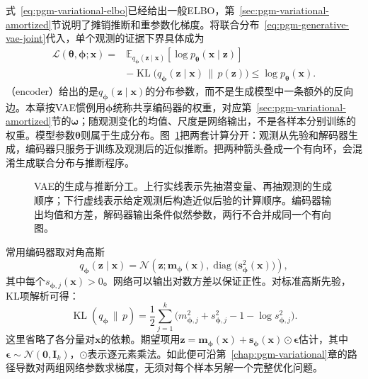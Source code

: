 式~\eqref{eq:pgm-variational-elbo}已经给出一般ELBO，第~\ref{sec:pgm-variational-amortized}节说明了摊销推断和重参数化梯度。将联合分布~\eqref{eq:pgm-generative-vae-joint}代入，单个观测的证据下界具体成为
\begin{equation}
  \label{eq:pgm-generative-vae-elbo}
  \begin{aligned}
    \mathcal{L}(\bm{\theta},\bm{\phi};\bm{x})
    ={}&\mathbb{E}_{q_{\bm{\phi}}(\bm{z}\mid\bm{x})}
       [\log p_{\bm{\theta}}(\bm{x}\mid\bm{z})]\\
      &-\operatorname{KL}\bigl(
       q_{\bm{\phi}}(\bm{z}\mid\bm{x})\,\|\,p(\bm{z})\bigr)
      \leq\log p_{\bm{\theta}}(\bm{x}).
  \end{aligned}
\end{equation}
（encoder）给出的是$q_{\bm{\phi}}(\bm{z}\mid\bm{x})$的分布参数，而不是生成模型中一条额外的反向边。本章按VAE惯例用$\bm{\phi}$统称共享编码器的权重，对应第~\ref{sec:pgm-variational-amortized}节的$\bm{\omega}$；随观测变化的均值、尺度是网络输出，不是各样本分别训练的权重。模型参数$\bm{\theta}$则属于生成分布。图~\ref{fig:pgm-generative-vae}把两套计算分开：观测从先验和解码器生成，编码器只服务于训练及观测后的近似推断。把两种箭头叠成一个有向环，会混淆生成联合分布与推断程序。

\begin{figure}[htbp]
  \centering
  
  \caption{VAE的生成与推断分工。上行实线表示先抽潜变量、再抽观测的生成顺序；下行虚线表示给定观测后构造近似后验的计算顺序。编码器输出均值和方差，解码器输出条件似然参数，两行不合并成同一个有向图。}
  \label{fig:pgm-generative-vae}
\end{figure}

常用编码器取对角高斯
\[
  q_{\bm{\phi}}(\bm{z}\mid\bm{x})
  =\mathcal{N}\!\left(
    \bm{z};\bm{m}_{\bm{\phi}}(\bm{x}),
    \operatorname{diag}\bigl(\bm{s}_{\bm{\phi}}^2(\bm{x})\bigr)
    \right),
\]
其中每个$s_{\bm{\phi},j}(\bm{x})>0$。网络可以输出对数方差以保证正性。对标准高斯先验，KL项解析可得：
\begin{equation}
  \label{eq:pgm-generative-diagonal-kl}
  \operatorname{KL}(q_{\bm{\phi}}\,\|\,p)
  =\frac{1}{2}\sum_{j=1}^{k}
     \bigl(m_{\bm{\phi},j}^2+s_{\bm{\phi},j}^2
            -1-\log s_{\bm{\phi},j}^2\bigr).
\end{equation}
这里省略了各分量对$\bm{x}$的依赖。期望项用$\bm{z}=\bm{m}_{\bm{\phi}}(\bm{x})+\bm{s}_{\bm{\phi}}(\bm{x})\odot\bm{\epsilon}$估计，其中$\bm{\epsilon}\sim\mathcal{N}(\bm{0},\bm{I}_k)$，$\odot$表示逐元素乘法。如此便可沿第~\ref{chap:pgm-variational}章的路径导数对两组网络参数求梯度，无须对每个样本另解一个完整优化问题。

